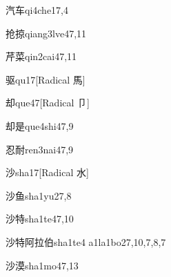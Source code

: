 \begin{verbete}{汽车}{qi4che1}{7,4}
\end{verbete}

\begin{verbete}{抢掠}{qiang3lve4}{7,11}
\end{verbete}

\begin{verbete}{芹菜}{qin2cai4}{7,11}
\end{verbete}

\begin{verbete}{驱}{qu1}{7}[Radical 馬]
\end{verbete}

\begin{verbete}{却}{que4}{7}[Radical 卩]
\end{verbete}

\begin{verbete}{却是}{que4shi4}{7,9}
\end{verbete}

\begin{verbete}{忍耐}{ren3nai4}{7,9}
\end{verbete}

\begin{verbete}{沙}{sha1}{7}[Radical 水]
\end{verbete}

\begin{verbete}{沙鱼}{sha1yu2}{7,8}
\end{verbete}

\begin{verbete}{沙特}{sha1te4}{7,10}
\end{verbete}

\begin{verbete}{沙特阿拉伯}{sha1te4 a1la1bo2}{7,10,7,8,7}
\end{verbete}

\begin{verbete}{沙漠}{sha1mo4}{7,13}
\end{verbete}

